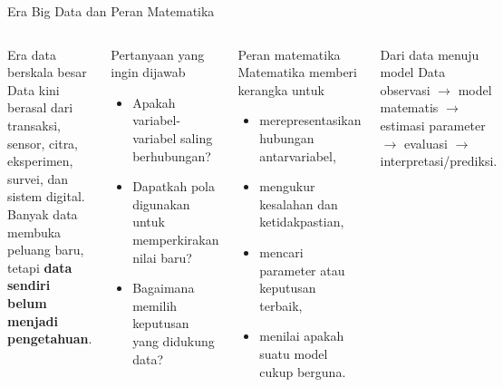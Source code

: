 \documentclass[aspectratio=169,11pt]{beamer}
\begin{document}
\begin{frame}{Era Big Data dan Peran Matematika}
\begin{columns}[T]
\begin{block}{Era data berskala besar}
\small
Data kini berasal dari transaksi, sensor, citra, eksperimen, survei, dan sistem digital. Banyak data membuka peluang baru, tetapi \textbf{data sendiri belum menjadi pengetahuan}.
\end{block}
\begin{block}{Pertanyaan yang ingin dijawab}
\small
\begin{itemize}
  \item Apakah variabel-variabel saling berhubungan?
  \item Dapatkah pola digunakan untuk memperkirakan nilai baru?
  \item Bagaimana memilih keputusan yang didukung data?
\end{itemize}
\end{block}
\begin{alertblock}{Peran matematika}
\small
Matematika memberi kerangka untuk
\begin{itemize}
  \item merepresentasikan hubungan antarvariabel,
  \item mengukur kesalahan dan ketidakpastian,
  \item mencari parameter atau keputusan terbaik,
  \item menilai apakah suatu model cukup berguna.
\end{itemize}
\end{alertblock}
\begin{block}{Dari data menuju model}
\small
Data observasi $\rightarrow$ model matematis $\rightarrow$ estimasi parameter $\rightarrow$ evaluasi $\rightarrow$ interpretasi/prediksi.
\end{block}
\end{columns}
\end{frame}
\end{document}
